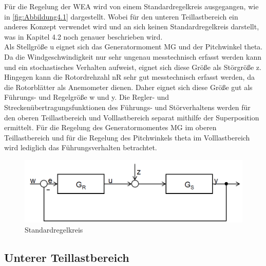 Für die Regelung der WEA wird von einem Standardregelkreis ausgegangen, wie in \autoref{fig:Abbildung4.1} dargestellt. Wobei für den unteren Teillastbereich ein anderes Konzept verwendet wird und an sich keinen Standardregelkreis darstellt, was in Kapitel 4.2 noch genauer beschrieben wird.
\\
Als Stellgröße u eignet sich das Generatormoment \acs{MG} und der Pitchwinkel \acs{theta}. Da die Windgeschwindigkeit nur sehr ungenau messtechnisch erfasst werden kann und ein stochastisches Verhalten aufweist, eignet sich diese Größe als Störgröße z. Hingegen kann die Rotordrehzahl \acs{nR} sehr gut messtechnisch erfasst werden, da die Rotorblätter als Anemometer dienen. Daher eignet sich diese Größe gut als Führungs- und Regelgröße w und y. Die Regler- und Streckenübertragungsfunktionen des Führungs- und Störverhaltens werden für den oberen Teillastbereich und Volllastbereich separat mithilfe der Superposition ermittelt. Für die Regelung des Generatormomentes \acs{MG} im oberen Teillastbereich und für die Regelung des Pitchwinkels \acs{theta} im Volllastbereich wird lediglich das Führungsverhalten betrachtet.

\begin{figure}[H]
    \centering
    \includegraphics[scale=0.45]{Bilder/Kapitel 6/Standardregelkreis.PNG}
    \caption{Standardregelkreis}
    \label{fig:Abbildung4.1}
\end{figure}

\subsection{Unterer Teillastbereich}

